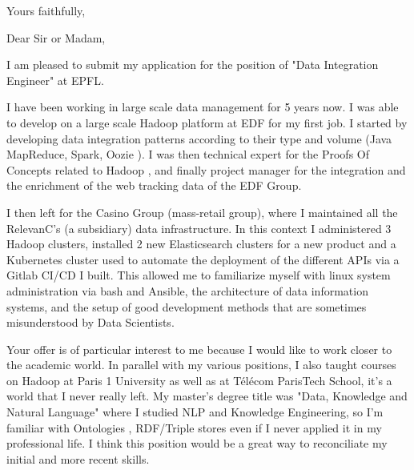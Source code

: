 \documentclass[11pt,a4paper,sans]{moderncv}        %
\begin{document}
\date{August 28 2019}
\opening{}
\closing{Yours faithfully,}

\makelettertitle

\bigskip
\bigskip
\bigskip
\bigskip
\bigskip

Dear Sir or Madam,
\bigskip


I am pleased to submit my application for the position of "Data Integration Engineer"
at EPFL.

I have been working in large scale data management for 5 years now. I was able to develop on a large scale Hadoop
platform at EDF for my first job. I started by developing data integration patterns according to their type and volume (Java MapReduce, Spark, Oozie
). I was then technical expert for the Proofs Of Concepts related to Hadoop
, and finally project manager for the integration and the enrichment of the web tracking data of the EDF Group.

I then left for the Casino Group (mass-retail group), where I maintained all the RelevanC's (a subsidiary) data infrastructure. In this context I administered 3 Hadoop
clusters, installed 2 new Elasticsearch
clusters for a new product and a Kubernetes
cluster used to automate the deployment of the different APIs
via a Gitlab CI/CD
I built. This allowed me to familiarize myself with linux system administration via bash and Ansible, the architecture of data information systems, and the setup of good development methods that are sometimes misunderstood by Data Scientists.

Your offer is of particular interest to me because I would like to work closer to the academic world. In parallel with my various positions, I also taught courses on Hadoop
at Paris 1 University as well as at Télécom
ParisTech School, it's a world that I never really left. My master’s degree title was "Data, Knowledge and Natural Language"
where I studied NLP
and Knowledge Engineering, so I'm familiar with Ontologies
, RDF/Triple stores even if I never applied it in my professional life. I think this position would be a great way to reconciliate
my initial and more recent skills.
\bigskip

\makeletterclosing
\end{document}
